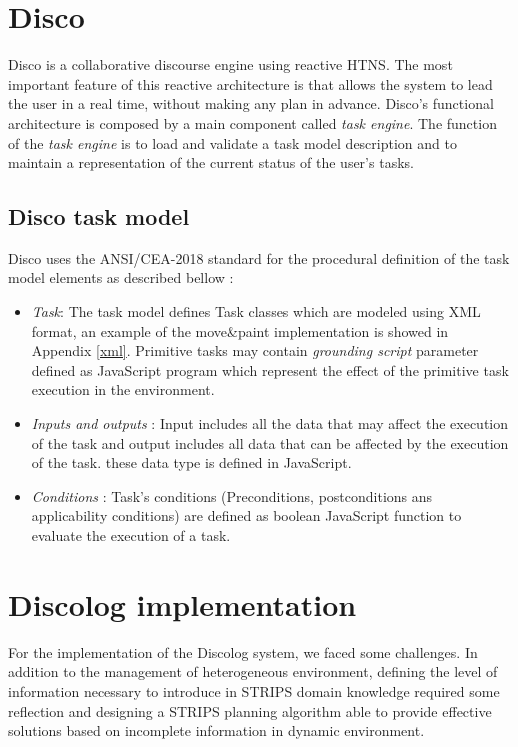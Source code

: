 \section{Disco}
Disco \cite{rich2009building}is a collaborative discourse engine using reactive HTNS. The  most important feature of this reactive architecture is that allows the system to lead the user in a real time, without making any plan in advance. Disco's functional architecture is composed by a main component called \textit{task engine}. 
The function of the \textit{task engine}  is to load and validate a task model description and to maintain a representation of the current status of the user’s tasks.\cite{rich2009building}  


\subsection{Disco task model}
Disco uses the ANSI/CEA-2018 standard for the procedural definition of the task model elements as described bellow :
\begin{itemize}
	\item \textit{Task}: The task model defines Task classes which are modeled using XML format, an example of the move\&paint implementation is showed in Appendix \ref{xml}. Primitive tasks may contain \textit{grounding script} parameter defined as JavaScript program which represent the effect of  the primitive task execution in the environment.
	
	\item \textit{Inputs and outputs} : Input includes all the data that may affect the execution of the task and output includes all data that can be affected by the execution of the task. these data type is defined in JavaScript.
	\item \textit{Conditions} : Task's conditions (Preconditions, postconditions ans applicability conditions) are defined as boolean JavaScript function to evaluate the execution of a task.

\end{itemize}

\section{Discolog implementation}
For the implementation of the Discolog system, we  faced some challenges. In addition to the management of heterogeneous environment, defining the level of information necessary to introduce in STRIPS domain knowledge required some reflection and designing a STRIPS planning algorithm able to provide effective solutions based on incomplete information in dynamic environment.
